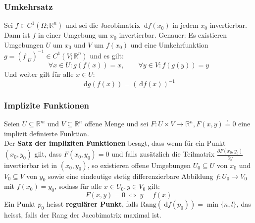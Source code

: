 \documentclass[a4paper,10pt]{scrartcl}
\newcommand{\diff}{\ \mathrm{d}}
\newcommand{\rang}{ \mathrm{Rang}}
\begin{document}
\subsubsection{Umkehrsatz}
Sei $f\in C^1(\Omega;\mathbb{R}^n)$ und sei die Jacobimatrix $\diff f(x_0)$ in jedem $x_0$ invertierbar. Dann ist $f$ in einer Umgebung um $x_0$ invertierbar. Genauer: Es existieren Umgebungen $U$ um $x_0$ und $V$ um $f(x_0)$ und eine Umkehrfunktion $g=(f|_U)^{-1}\in C^1(V;\mathbb{R}^n)$ und es gilt: 
\begin{equation}
	\forall x\in U:g(f(x))=x,\qquad \forall y\in V:f(g(y))=y 
\end{equation}
Und weiter gilt für alle $x\in U$: 
\begin{equation}
	\diff g(f(x))= (\diff f(x))^{-1}
\end{equation}
\subsubsection{Implizite Funktionen}
Seien $ U\subseteq \mathbb {R} ^{m}$ und $V\subseteq \mathbb {R} ^{n}$ offene Menge und sei $F:U\times V\to \mathbb{R}^n, F(x,y) \overset{!}{=} 0$ eine implizit definierte Funktion. \\
Der\textbf{ Satz der impliziten Funktionen} besagt, dass wenn für ein Punkt $(x_0,y_0)$ gilt, dass $F(x_0,y_0)=0$ und falls zusätzlich die Teilmatrix $\frac{\partial F(x_0,y_0)}{\partial y}$ invertierbar ist in $(x_0,y_0)$, so existieren offene Umgebungen $U_0 \subseteq U$ von $x_0$ und $V_0 \subseteq V$ von $y_0$ sowie eine eindeutige stetig differenzierbare Abbildung $f\colon U_0 \to V_0$ mit $f(x_0) = y_0$, sodass für alle $x \in U_0, y \in V_0$ gilt: 
\begin{equation*}
	F(x,y) = 0 \;\Leftrightarrow\; y = f(x)
\end{equation*}
Ein Punkt $p_0$ heisst \textbf{regulärer Punkt}, falls $\rang(\diff f(p_0))=\min\{n,l\}$, das heisst, falls der Rang der Jacobimatrix maximal ist. 
\end{document}
